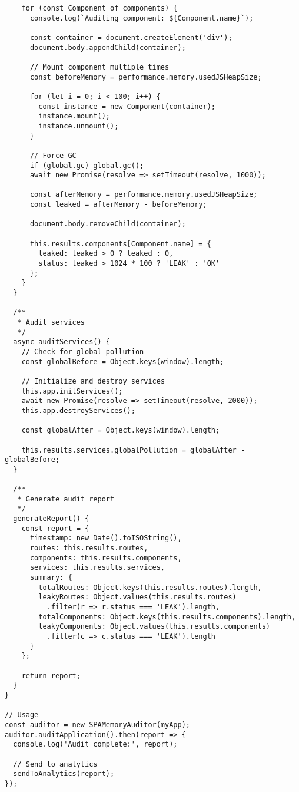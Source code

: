 \documentclass[11pt]{article}
\begin{document}
\begin{verbatim}
    for (const Component of components) {
      console.log(`Auditing component: ${Component.name}`);
      
      const container = document.createElement('div');
      document.body.appendChild(container);
      
      // Mount component multiple times
      const beforeMemory = performance.memory.usedJSHeapSize;
      
      for (let i = 0; i < 100; i++) {
        const instance = new Component(container);
        instance.mount();
        instance.unmount();
      }
      
      // Force GC
      if (global.gc) global.gc();
      await new Promise(resolve => setTimeout(resolve, 1000));
      
      const afterMemory = performance.memory.usedJSHeapSize;
      const leaked = afterMemory - beforeMemory;
      
      document.body.removeChild(container);
      
      this.results.components[Component.name] = {
        leaked: leaked > 0 ? leaked : 0,
        status: leaked > 1024 * 100 ? 'LEAK' : 'OK'
      };
    }
  }
  
  /**
   * Audit services
   */
  async auditServices() {
    // Check for global pollution
    const globalBefore = Object.keys(window).length;
    
    // Initialize and destroy services
    this.app.initServices();
    await new Promise(resolve => setTimeout(resolve, 2000));
    this.app.destroyServices();
    
    const globalAfter = Object.keys(window).length;
    
    this.results.services.globalPollution = globalAfter - globalBefore;
  }
  
  /**
   * Generate audit report
   */
  generateReport() {
    const report = {
      timestamp: new Date().toISOString(),
      routes: this.results.routes,
      components: this.results.components,
      services: this.results.services,
      summary: {
        totalRoutes: Object.keys(this.results.routes).length,
        leakyRoutes: Object.values(this.results.routes)
          .filter(r => r.status === 'LEAK').length,
        totalComponents: Object.keys(this.results.components).length,
        leakyComponents: Object.values(this.results.components)
          .filter(c => c.status === 'LEAK').length
      }
    };
    
    return report;
  }
}

// Usage
const auditor = new SPAMemoryAuditor(myApp);
auditor.auditApplication().then(report => {
  console.log('Audit complete:', report);
  
  // Send to analytics
  sendToAnalytics(report);
});
\end{verbatim}
\end{document}
